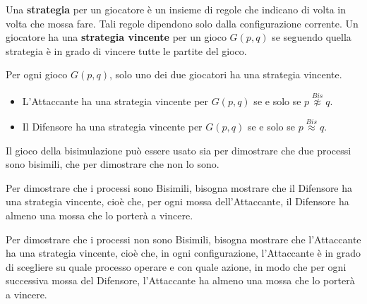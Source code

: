 Una \textbf{strategia} per un giocatore è un insieme di regole che indicano di
volta in volta che mossa fare. Tali regole dipendono solo dalla configurazione
corrente. Un giocatore ha una \textbf{strategia vincente} per un gioco $G(p, q)$
se seguendo quella strategia è in grado di vincere tutte le partite del gioco.
\begin{teorema}
    Per ogni gioco $G(p, q)$, solo uno dei due giocatori ha una strategia vincente.
\end{teorema}
\begin{teorema}
    \begin{itemize}
        \item L'Attaccante ha una strategia vincente per $G(p, q)$ se e solo se
              $p \stackrel{Bis}{\not\approx} q$.
        \item Il Difensore ha una strategia vincente per $G(p, q)$ se e solo se
              $p \stackrel{Bis}{\approx} q$.
    \end{itemize}
\end{teorema}
\begin{nota}
    Il gioco della bisimulazione può essere usato sia per dimostrare che due
    processi sono bisimili, che per dimostrare che non lo sono.
\end{nota}
Per dimostrare che i processi sono Bisimili, bisogna mostrare che il Difensore
ha una strategia vincente, cioè che, per ogni mossa dell'Attaccante, il Difensore
ha almeno una mossa che lo porterà a vincere.

Per dimostrare che i processi non sono Bisimili, bisogna mostrare che l'Attaccante
ha una strategia vincente, cioè che, in ogni configurazione, l'Attaccante è in
grado di scegliere su quale processo operare e con quale azione, in modo che per
ogni successiva mossa del Difensore, l'Attaccante ha almeno una mossa che lo
porterà a vincere.
